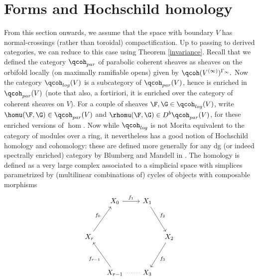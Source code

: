 \documentclass{article}
\begin{document}
\section{Forms and Hochschild homology}
From this section onwards, we assume that the space with boundary $V$ has normal-crossings (rather than toroidal) compactification. Up to passing to derived categories, we can reduce to this case using Theorem \ref{invariance}. Recall that we defined the category $\qcoh_{par}$ of parabolic coherent sheaves as sheaves on the orbifold locally (on maximally ramifiable opens) given by $\qcoh(V^{(\infty)})^{\Gamma_\infty}.$ Now the category $\qcoh_{log}(V)$ is a subcategory of $\qcoh_{par}(V)$, hence is enriched in $\qcoh_{par}(V)$ (note that also, a fortiriori, it is enriched over the category of coherent sheaves on $V$). For a couple of sheaves $\F, \G\in \qcoh_{log}(V)$, write $\homu(\F, \G)\in \qcoh_{par}(V)$ and $\rhomu(\F, \G)\in D^b\qcoh_{par}(V)$, for these enriched versions of $\hom.$ Now while $\qcoh_{log}$ is not Morita equivalent to the category of modules over a ring, it nevertheless has a good notion of Hochschild homology and cohomology: these are defined more generally for any dg (or indeed spectrally enriched) category by Blumberg and Mandell in \cite{blumberg-mandell}. The homology is defined as a very large complex associated to a simplicial space with simplices parametrized by (multilinear combinations of) cycles of objects with composable morphisms 
\[
\begin{tikzcd}[row sep=3.6em,column sep=1em]
& X_0\arrow[rr,"f_1"] && X_1 \arrow[dr,"f_2"] \\
X_r\arrow[ur,"f_0"]  &&  && X_2\arrow[dl, "f_3"] \\
& X_{r-1} \arrow[ul,"f_{r-1}"] && X_3 \arrow[ll, dotted, no head]
\end{tikzcd}
\]
\end{document}
